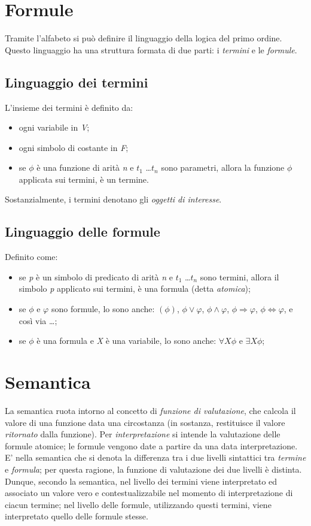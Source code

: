 \section{Formule}
Tramite l'alfabeto si può definire il linguaggio della logica del primo ordine. \\
Questo linguaggio ha una struttura formata di due parti: i \textit{termini} e le \textit{formule}.
\subsection{Linguaggio dei termini}
L'insieme dei termini è definito da:
\begin{itemize}
	\item ogni variabile in \textit{V};
	\item ogni simbolo di costante in \textit{F};
	\item se $\phi$ è una funzione di arità \textit{n} e $t_{1}$ \ldots $t_{n}$ sono parametri, allora la funzione $\phi$ applicata sui termini, è un termine.
\end{itemize}
Sostanzialmente, i termini denotano gli \textit{oggetti di interesse}.
\subsection{Linguaggio delle formule}
Definito come:
\begin{itemize}
	\item se \textit{p} è un simbolo di predicato di arità \textit{n} e $t_{1}$ \ldots $t_{n}$ sono termini, allora il simbolo \textit{p} applicato sui termini, è una formula (detta \textit{atomica});
	\item se $\phi$ e $\varphi$ sono formule, lo sono anche: $(\phi)$, $\phi \vee \varphi$, $\phi \wedge \varphi$, $\phi \Rightarrow \varphi$, $\phi \Leftrightarrow \varphi$, e così via \ldots;
	\item se $\phi$ è una formula e \textit{X} è una variabile, lo sono anche: $\forall X \phi$ e $\exists X \phi$;
\end{itemize}

\section{Semantica}
La semantica ruota intorno al concetto di \textit{funzione di valutazione}, che calcola il valore di una funzione data una circostanza (in sostanza, restituisce il valore \textit{ritornato} dalla funzione).
Per \textit{interpretazione} si intende la valutazione delle formule atomice; le formule vengono date a partire da una data interpretazione. \\
E' nella semantica che si denota la differenza tra i due livelli sintattici tra \textit{termine} e \textit{formula}; per questa ragione, la funzione di valutazione dei due livelli è distinta. \\
Dunque, secondo la semantica, nel livello dei termini viene interpretato ed associato un valore vero e contestualizzabile nel momento di interpretazione di ciacun termine; nel livello delle formule, utilizzando questi termini, viene interpretato quello delle formule stesse.

